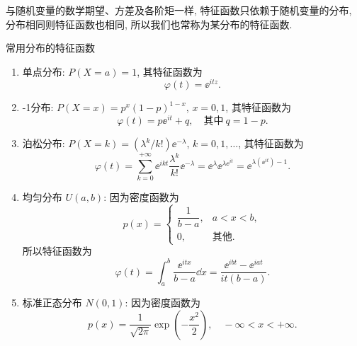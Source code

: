 与随机变量的数学期望、方差及各阶矩一样,
特征函数只依赖于随机变量的分布,
分布相同则特征函数也相同,
所以我们也常称为某{\heiti 分布的特征函数}.


\begin{example}\label{exam:4.1.1}
    常用分布的特征函数
    \begin{enumerate}
        \item
        {\heiti 单点分布}: $ P (X = a) = 1 $,
        其特征函数为
        \begin{equation*}
            \varphi (t) = \ee^{itz}.
        \end{equation*}
        \item\label{exam:4.1.1.2}
        {-1分布}: $ P( X = x ) = p^x  ( 1 - p )^{1 - x} $, $ x = 0,1 $,
        其特征函数为
        \begin{equation*}
            \varphi (t) = p \ee^{it} + q, \quad \text{其中} \ q= 1 - p.
        \end{equation*}
        \item
        {\heiti 泊松分布}: $ P ( X = k ) = ( \lambda^k/k! ) \ee^{-\lambda} $, $ k = 0, 1, \dotsc $, 其特征函数为
        \begin{equation*}
            \varphi (t) = \sum_{k=0}^{+\infty} \ee^{ikt} \frac{\lambda^k}{k!} \ee^{-\lambda} = \ee^{\lambda} \ee^{\lambda \ee^{it}} = \ee^{\lambda ( \ee^{it} ) -1}.
        \end{equation*}
        \item
        {\heiti 均匀分布} $ U ( a,b ) $: 因为密度函数为
        \begin{equation*}
            p (x) =
            \begin{cases}
                \dfrac{1}{b-a}, & a < x < b,\\
                0, & \text{其他}.
            \end{cases}
        \end{equation*}
        所以特征函数为
        \begin{equation*}
            \varphi (t) = \int_a^b \frac{\ee^{itx}}{b - a} \dd x = \frac{\ee^{ibt} - \ee^{iat}}{it (b-a)}.
        \end{equation*}
        \item
        {\heiti 标准正态分布} $ N (0,1) $: 因为密度函数为
        \begin{equation*}
            p (x) = \frac{1}{\sqrt{2\pi}} \exp \left( -\frac{x^2}{2} \right), \quad - \infty < x < + \infty.

\end{equation*}
\end{enumerate}
\end{example}
